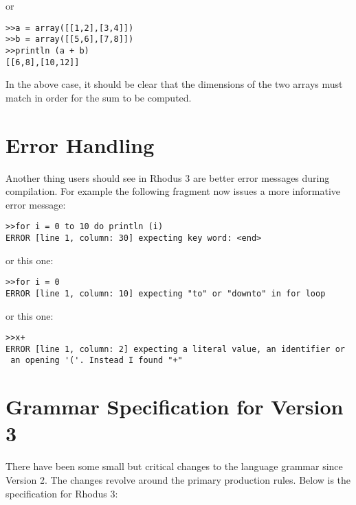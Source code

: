 or

\begin{lstlisting}
>>a = array([[1,2],[3,4]])
>>b = array([[5,6],[7,8]])
>>println (a + b)
[[6,8],[10,12]]
\end{lstlisting}

In the above case, it should be clear that the dimensions of the two arrays must match in order for the sum to be computed.

\section{Error Handling}

Another thing users should see in Rhodus 3 are better error messages during compilation. For example the following fragment now issues a more informative error message:

\begin{lstlisting}
>>for i = 0 to 10 do println (i)
ERROR [line 1, column: 30] expecting key word: <end>
\end{lstlisting}

or this one:

\begin{lstlisting}
>>for i = 0
ERROR [line 1, column: 10] expecting "to" or "downto" in for loop
\end{lstlisting}

or this one:

\begin{lstlisting}
>>x+
ERROR [line 1, column: 2] expecting a literal value, an identifier or
 an opening '('. Instead I found "+"
\end{lstlisting}

\section{Grammar Specification for Version 3}

There have been some small but critical changes to the language grammar since Version 2. The changes revolve around the primary production rules. Below is the specification for Rhodus 3:

